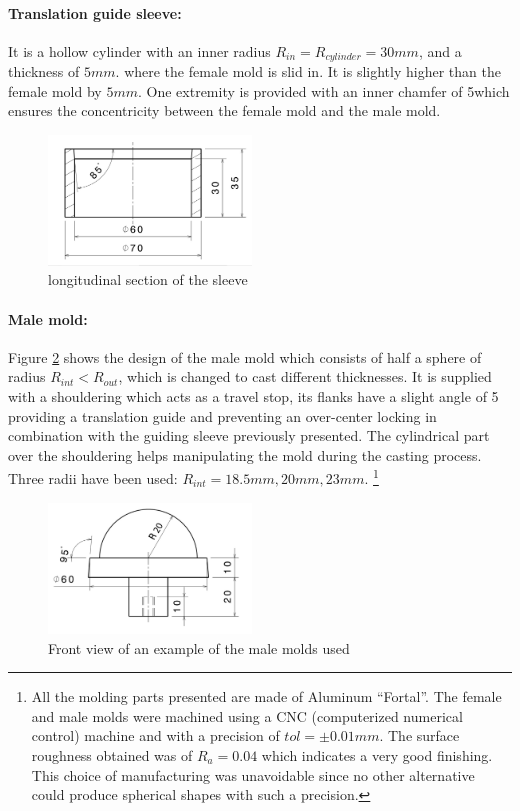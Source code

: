 \paragraph{Translation guide sleeve:}
It is a hollow cylinder with an inner radius $R_{in} = R_{cylinder} = 30 mm$, and a thickness of $5 mm$. where the female mold is slid in. It is slightly higher than the female mold by $5 mm$. One extremity is provided with an inner chamfer of 5\textdegree which ensures the concentricity between the female mold and the male mold.
\begin{figure}[H] %
	\centering%
  \includegraphics[width=0.48\textwidth]{figures/Chapter_1/sleeve_translation.jpg}
  \caption{longitudinal section of the sleeve}%
	\label{fig:sleeve_1}%
\end{figure}

\paragraph{Male mold:}
Figure \ref{fig:male_mold} shows the design of the male mold which consists of half a sphere of radius $R_{int}<R_{out}$, which is changed to cast different thicknesses. It is supplied with a shouldering which acts as a travel stop, its flanks have a slight angle of 5 providing a translation guide and preventing an over-center locking in combination with the guiding sleeve previously presented. The cylindrical part over the shouldering helps manipulating the mold during the casting process. Three radii have been used: $R_{int} = 18.5 mm, 20 mm, 23 mm$. 
\footnote{All the molding parts presented are made of Aluminum "`Fortal"'. The female and male molds were machined using a CNC (computerized numerical control)  machine and with a precision of $tol =\pm 0.01 mm$. The surface roughness obtained was of $R_a = 0.04$ which indicates a very good finishing.
This choice of manufacturing was unavoidable since no other alternative could produce spherical shapes with such a precision.}
\begin{figure}[H] %
	\centering%
  \includegraphics[width=0.48\textwidth]{figures/Chapter_1/male_mold.jpg}
	\caption{Front view of an example of the male molds used}
	\label{fig:male_mold}
\end{figure}

